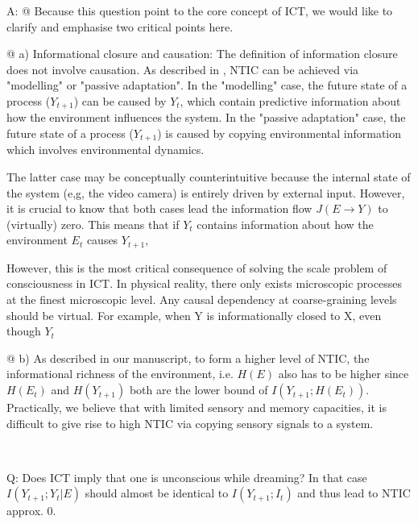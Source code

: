 \documentclass[utf8]{article}
\newcounter{cQuestion}[section]
\newenvironment{question}
    {\refstepcounter{cQuestion}\color{Blue}\noindent\newline Q\thecQuestion:}
    {~\newline}
\newenvironment{ans}  
    {\color{Black}\noindent A:}
    {~\newline}
\begin{document}
\begin{ans}
	    @ Because this question point to the core concept of ICT, we would like to clarify and emphasise two critical points here. 
	    
	    @ a) Informational closure and causation: The definition of information closure \citep{BERTSCHINGER.2006} does not involve causation. As described in \cite{BERTSCHINGER.2006}, NTIC can be achieved via "modelling" or "passive adaptation".  In the "modelling" case, the future state of a process ($Y_{t+1}$) can be caused by $Y_t$, which contain predictive information about how the environment influences the system. In the "passive adaptation" case,  the future state of a process ($Y_{t+1}$) is caused by copying environmental information which involves environmental dynamics. 
	    
	    The latter case may be conceptually counterintuitive because the internal state of the system (e,g, the video camera) is entirely driven by external input. However, it is crucial to know that both cases lead the information flow $J(E\rightarrow Y)$ to (virtually) zero. This means that if $Y_t$ contains information about how the environment $E_t$ causes $Y_{t+1}$, 
	    
	    However, this is the most critical consequence of solving the scale problem of consciousness in ICT. In physical reality, there only exists microscopic processes at the finest microscopic level. Any causal dependency at coarse-graining levels should be virtual. For example, when Y is informationally closed to X, even though $Y_t$
	    
	    @ b) As described in our manuscript, to form a higher level of NTIC, the informational richness of the environment, i.e. $H(E)$ also has to be higher since $H(E_t)$ and $H(Y_{t+1})$ both are the lower bound of $I(Y_{t+1}; H(E_t))$. Practically, we believe that with limited sensory and memory capacities, it is difficult to give rise to high NTIC via copying sensory signals to a system. 
	    
	    
	    
	    
            
            
        \end{ans}
        
        \begin{question}
            Does ICT imply that one is unconscious while dreaming? In that case $I(Y_{t+1}; Y_t|E)$ should almost be identical to $I(Y_{t+1};I_t)$ and thus lead to NTIC approx. 0.        
        \end{question}
    
\end{document}
